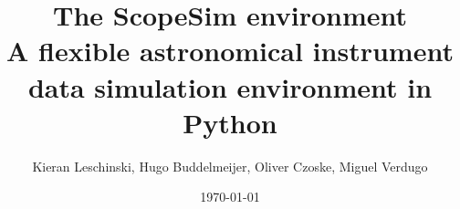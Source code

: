 \documentclass[a4paper,11pt]{article}
\providecommand*{\DUdocumentsubtitle}[1]{{\large #1}}
\begin{document}
\title{The ScopeSim environment%
  \label{the-scopeSim-environment}%
  \\%
  \DUdocumentsubtitle{A flexible astronomical instrument data simulation environment in Python}%
  \label{subtitle}}
\author{Kieran Leschinski, Hugo Buddelmeijer, Oliver Czoske, Miguel Verdugo}
\date{\today}

\maketitle

















\end{document}

